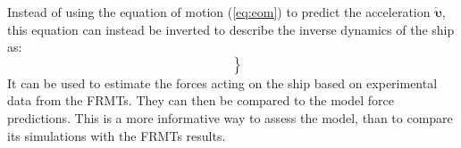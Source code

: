\noindent Instead of using the equation of motion (\autoref{eq:eom}) to predict the acceleration $\pmb{\bm{\dot{\upsilon}}}$, this equation can instead be inverted to describe the inverse dynamics of the ship as:
\begin{equation}
    \label{eq:ID_X}
    \left.\begin{aligned}
     \\
     \\
    
    \end{aligned}\right\}
\end{equation}
%     
%     
It can be used to estimate the forces acting on the ship based on experimental data from the FRMTs. They can then be compared to the model force predictions. This is a more informative way to assess the model, than to compare its simulations with the FRMTs results.